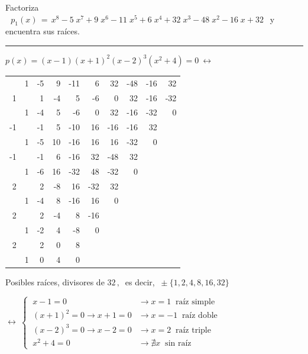 \begin{miejercicio}

Factoriza $\ \ \ p_1(x) \, =  \, x^{8} - 5 \; x^{7} + 9 \; x^{6} - 11 \; x^{5} + 6 \; x^{4} + 32 \; x^{3} - 48 \; x^{2} - 16 \; x + 32	\ \ $  y encuentra sus raíces.

\rule{250pt}{0.1pt}

\vspace{5mm}
$p(x)=(x-1)(x+1)^2(x-2)^3(x^2+4)=0 \ \leftrightarrow \ $

\begin{table}[H]
\centering
\begin{tabular}{r|rrrrrrrrr}
 & 1 & -5 & 9 & -11 & 6 & 32 & -48 & -16 & 32 \\
1 &  & 1 & -4 & 5 & -6 & 0 & 32 & -16 & -32 \\ \hline
 & 1 & -4 & 5 & -6 & 0 & 32 & -16 & \multicolumn{1}{r|}{-32} & 0 \\ \cline{10-10} 
-1 &  & -1 & 5 & -10 & 16 & -16 & -16 & 32 &  \\ \cline{1-9}
 & 1 & -5 & 10 & -16 & 16 & 16 & \multicolumn{1}{r|}{-32} & 0 &  \\ \cline{9-9}
-1 &  & -1 & 6 & -16 & 32 & -48 & 32 &  &  \\ \cline{1-8}
 & 1 & -6 & 16 & -32 & 48 & \multicolumn{1}{r|}{-32} & 0 &  &  \\ \cline{8-8}
2 &  & 2 & -8 & 16 & -32 & 32 &  &  &  \\ \cline{1-7}
 & 1 & -4 & 8 & -16 & \multicolumn{1}{r|}{16} & 0 &  &  &  \\ \cline{7-7}
2 &  & 2 & -4 & 8 & -16 &  &  &  &  \\ \cline{1-6}
 & 1 & -2 & 4 & \multicolumn{1}{r|}{-8} & 0 &  &  &  &  \\ \cline{6-6}
2 &  & 2 & 0 & 8 &  &  &  &  &  \\ \cline{1-5}
 & 1 & 0 & \multicolumn{1}{r|}{4} & 0 &  &  &  &  &  \\ \cline{5-5}
\end{tabular}
\end{table}

\vspace{5mm} Posibles raíces, divisores de $32\, , \ $ es decir,  $\ \pm \{1,2,4,8,16,32\}$ 

\vspace{2mm} \hspace{2cm} $\leftrightarrow \  \begin{cases}
\ x-1=0 & \to x=1 \ \text{ raíz simple} 	\\
\ (x+1)^2=0 \to x+1=0 & \to x=-1 \ \text{ raíz doble} 	\\
\ (x-2)^3=0 \to x-2=0 & \to x=2 \ \text{ raíz triple} 	\\
\ x^2+4=0 & \to \nexists x \ \text{ sin raíz}
 \end{cases}$



\end{miejercicio}



